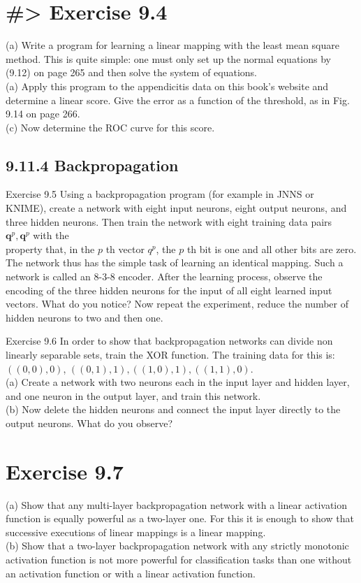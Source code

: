 \documentclass[10pt]{article}
\begin{document}
\section*{\#> Exercise 9.4}
(a) Write a program for learning a linear mapping with the least mean square method. This is quite simple: one must only set up the normal equations by (9.12) on page 265 and then solve the system of equations.\\
(a) Apply this program to the appendicitis data on this book's website and determine a linear score. Give the error as a function of the threshold, as in Fig. 9.14 on page 266.\\
(c) Now determine the ROC curve for this score.

\subsection*{9.11.4 Backpropagation}
Exercise 9.5 Using a backpropagation program (for example in JNNS or KNIME), create a network with eight input neurons, eight output neurons, and three hidden neurons. Then train the network with eight training data pairs $\boldsymbol{q}^{p}, \boldsymbol{q}^{p}$ with the\\
property that, in the $p$ th vector $q^{p}$, the $p$ th bit is one and all other bits are zero. The network thus has the simple task of learning an identical mapping. Such a network is called an 8-3-8 encoder. After the learning process, observe the encoding of the three hidden neurons for the input of all eight learned input vectors. What do you notice? Now repeat the experiment, reduce the number of hidden neurons to two and then one.

Exercise 9.6 In order to show that backpropagation networks can divide non linearly separable sets, train the XOR function. The training data for this is: $((0,0), 0)$, $((0,1), 1),((1,0), 1),((1,1), 0)$.\\
(a) Create a network with two neurons each in the input layer and hidden layer, and one neuron in the output layer, and train this network.\\
(b) Now delete the hidden neurons and connect the input layer directly to the output neurons. What do you observe?

\section*{Exercise 9.7}
(a) Show that any multi-layer backpropagation network with a linear activation function is equally powerful as a two-layer one. For this it is enough to show that successive executions of linear mappings is a linear mapping.\\
(b) Show that a two-layer backpropagation network with any strictly monotonic activation function is not more powerful for classification tasks than one without an activation function or with a linear activation function.
\end{document}
